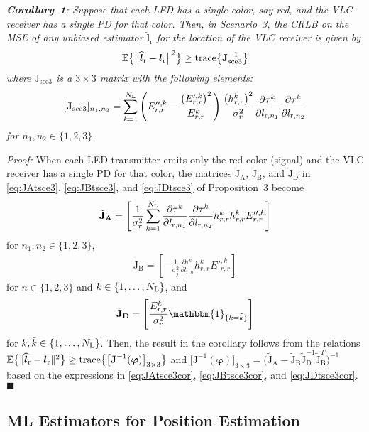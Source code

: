 \documentclass[10pt,twocolumn]{IEEEtran}
\newcommand{\NL}{N_{\rm{L}}}
\newcommand{\bvp}{{\boldsymbol{\varphi}}}
\newcommand{\expectation}{{\mathbb{E}}}
\newcommand{\lr}{{\boldsymbol{l}_{\mathrm{r}}}}
\newcommand{\lrh}{{\widehat{\boldsymbol{l}}_{\mathrm{r}}}}
\newcommand{\lrs}[1]{{l_{\mathrm{r},#1}}}
\newcommand{\JsyniT}{{\boldsymbol{\mathrm{J}}_{\mathrm{sce3}}^{-1}}}
\newcommand{\JsynT}{{\boldsymbol{\mathrm{J}}_{\mathrm{sce3}}}}
\newcommand{\Jvi}{{\boldsymbol{\mathrm{J}}^{-1}(\bvp)}}
\newcommand{\JAt}{\tilde{{\boldsymbol{\mathrm{J}}}}_{\boldsymbol{\mathrm{A}}}}
\newcommand{\JBt}{\tilde{{\boldsymbol{\mathrm{J}}}}_{\boldsymbol{\mathrm{B}}}}
\newcommand{\JDt}{\tilde{{\boldsymbol{\mathrm{J}}}}_{\boldsymbol{\mathrm{D}}}}
\begin{document}
\textit{\textbf{Corollary~1}: Suppose that each LED has a single color, say red, and the VLC receiver has a single PD for that color. Then, in Scenario~3, the CRLB on the MSE of any unbiased estimator $\lrh$ for the location of the VLC receiver is given by}
\begin{gather}\label{eq:CRLBsce3_Cor}
\expectation \big\{ \big\|\lrh - \lr \big\|^2 \big\}\geq{\rm{trace}}\big\{\JsyniT\big\}
\end{gather}
\textit{where $\JsynT$ is a $3\times3$ matrix with the following elements:}
\begin{align}\label{eq:Sce3blockFIMcor}
[\JsynT]_{n_1,n_2}=\sum_{k=1}^{\NL}\left(E''^{,k}_{r,r}
-\frac{\big(E'^{,k}_{r,r}\big)^2}{E^{k}_{r,r}}\right)\frac{\big(h^k_{r,r}\big)^2}{\sigma_r^2}
\frac{\partial \tau^k}{\partial \lrs{n_1}}\frac{\partial \tau^k}{\partial \lrs{n_2}}
\end{align}
\textit{for $n_1,n_2\in\{1,2,3\}$.}

\indent\indent\textit{Proof:} When each LED transmitter emits only the red color (signal) and the VLC receiver has a single PD for that color, the matrices $\JAt$, $\JBt$, and $\JDt$ in \eqref{eq:JAtsce3}, \eqref{eq:JBtsce3}, and \eqref{eq:JDtsce3} of Proposition~3 become
\begin{gather}\label{eq:JAtsce3cor}
\JAt=\left[\frac{1}{\sigma_r^2}\sum_{k=1}^{\NL}\frac{\partial \tau^k}{\partial \lrs{n_1}}\frac{\partial \tau^k}{\partial \lrs{n_2}}h^k_{r,r}h^k_{r,r}E''^{,k}_{r,r}\right]
\end{gather}
for $n_1,n_2\in\{1,2,3\}$,
\begin{gather}\label{eq:JBtsce3cor}
\JBt=\left[-\frac{1}{\sigma_j^2}\frac{\partial \tau^k}{\partial \lrs{n}}h^k_{r,r}E'^{,k}_{r,r}\right]
\end{gather}
for $n\in\{1,2,3\}$ and $k\in\{1,\ldots,\NL\}$, and
\begin{gather}\label{eq:JDtsce3cor}
\JDt=\left[\frac{E^k_{r,r}}{\sigma_r^2}\mathbbm{1}_{\{k=\tilde{k}\}}\right]
\end{gather}
for $k,\tilde{k}\in\{1,\ldots,\NL\}$. Then, the result in the corollary follows from the relations
$\expectation \big\{ \|\lrh - \lr \|^2 \big\}\geq{\rm{trace}}\big\{\big[\Jvi\big]_{3\times3}\big\}$ and $\big[\Jvi\big]_{3\times3}=\big(\JAt-\JBt\JDt^{-1}\JBt^T\big)^{-1}$ based on the expressions in \eqref{eq:JAtsce3cor}, \eqref{eq:JBtsce3cor}, and \eqref{eq:JDtsce3cor}.\hfill$\blacksquare$


\subsection{ML Estimators for Position Estimation}\label{sec:MLpos}
\end{document}
